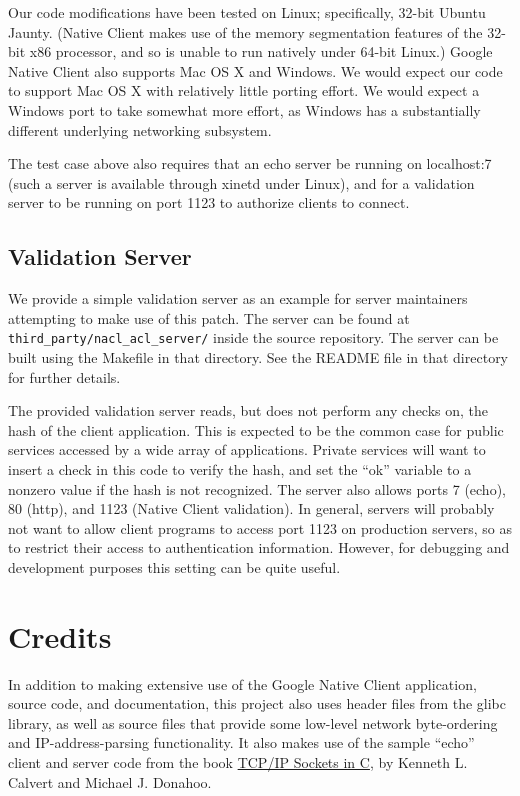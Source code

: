 \documentclass[a4paper,10pt]{article}
\begin{document}
Our code modifications have been tested on Linux; specifically, 32-bit Ubuntu
Jaunty.  (Native Client makes use of the memory segmentation features of
the 32-bit x86 processor, and so is unable to run natively under 64-bit Linux.)
Google Native Client also supports Mac OS X and Windows. We would expect our
code to support Mac OS X with relatively little porting effort. We would expect
a Windows port to take somewhat more effort, as Windows has a substantially
different underlying networking subsystem.

The test case above also requires that an echo server be running on
localhost:7 (such a server is available through xinetd under Linux), and for a
validation server to be running on port 1123 to authorize clients to connect.

\subsection{Validation Server}

We provide a simple validation server as an example for server maintainers
attempting to make use of this patch.  The server can be found at
\texttt{third\_party/nacl\_acl\_server/} inside the source repository.  The
server can be built using the Makefile in that directory.  See the README file
in that directory for further details.

The provided validation server reads, but does not perform any checks on, the
hash of the client application.  This is expected to be the common case for
public services accessed by a wide array of applications.  Private services
will want to insert a check in this code to verify the hash, and set the ``ok''
variable to a nonzero value if the hash is not recognized.  The server also
allows ports 7 (echo), 80 (http), and 1123 (Native Client validation).  In
general, servers will probably not want to allow client programs to access port
1123 on production servers, so as to restrict their access to authentication
information. However, for debugging and development purposes this setting can be
quite useful.

\section{Credits}

In addition to making extensive use of the Google Native Client application,
source code, and documentation, this project also uses header files from
the glibc library,  as well as source files that provide some low-level network
byte-ordering and IP-address-parsing functionality.  It also makes use of the
sample ``echo'' client and server code from the book \underline{TCP/IP Sockets
in C}, by Kenneth L. Calvert and Michael J. Donahoo.
\end{document}
